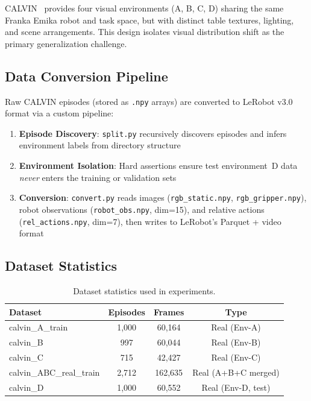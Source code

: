 \documentclass[10pt,twocolumn]{article}
\begin{document}
CALVIN~\cite{mees2022calvin} provides four visual environments (A, B, C, D) sharing the same Franka Emika robot and task space, but with distinct table textures, lighting, and scene arrangements. This design isolates visual distribution shift as the primary generalization challenge.

\subsection{Data Conversion Pipeline}

Raw CALVIN episodes (stored as \texttt{.npy} arrays) are converted to LeRobot v3.0 format via a custom pipeline:

\begin{enumerate}[nosep]
    \item \textbf{Episode Discovery}: \texttt{split.py} recursively discovers episodes and infers environment labels from directory structure
    \item \textbf{Environment Isolation}: Hard assertions ensure test environment~D data \emph{never} enters the training or validation sets
    \item \textbf{Conversion}: \texttt{convert.py} reads images (\texttt{rgb\_static.npy}, \texttt{rgb\_gripper.npy}), robot observations (\texttt{robot\_obs.npy}, dim=15), and relative actions (\texttt{rel\_actions.npy}, dim=7), then writes to LeRobot's Parquet + video format
\end{enumerate}

\subsection{Dataset Statistics}

\begin{table}[H]
\centering
\caption{Dataset statistics used in experiments.}
\label{tab:datasets}
\begin{tabular}{lccc}
\toprule
\textbf{Dataset} & \textbf{Episodes} & \textbf{Frames} & \textbf{Type} \\
\midrule
calvin\_A\_train & 1,000 & 60,164 & Real (Env-A) \\
calvin\_B & 997 & 60,044 & Real (Env-B) \\
calvin\_C & 715 & 42,427 & Real (Env-C) \\
calvin\_ABC\_real\_train & 2,712 & 162,635 & Real (A+B+C merged) \\
calvin\_D & 1,000 & 60,552 & Real (Env-D, test) \\
\bottomrule
\end{tabular}
\end{table}
\end{document}
